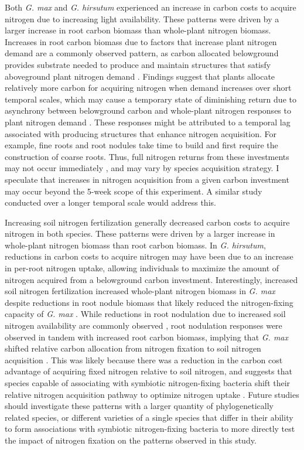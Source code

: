 Both \textit{G. max} and \textit{G. hirsutum} experienced an increase in carbon costs to acquire nitrogen due to increasing light availability. These patterns were driven by a larger increase in root carbon biomass than whole-plant nitrogen biomass. Increases in root carbon biomass due to factors that increase plant nitrogen demand are a commonly observed pattern, as carbon allocated belowground provides substrate needed to produce and maintain structures that satisfy aboveground plant nitrogen demand . Findings suggest that plants allocate relatively more carbon for acquiring nitrogen when demand increases over short temporal scales, which may cause a temporary state of diminishing return due to asynchrony between belowground carbon and whole-plant nitrogen responses to plant nitrogen demand . These responses might be attributed to a temporal lag associated with producing structures that enhance nitrogen acquisition. For example, fine roots  and root nodules  take time to build and first require the construction of coarse roots. Thus, full nitrogen returns from these investments may not occur immediately , and may vary by species acquisition strategy. I speculate that increases in nitrogen acquisition from a given carbon investment may occur beyond the 5-week scope of this experiment. A similar study conducted over a longer temporal scale would address this.

Increasing soil nitrogen fertilization generally decreased carbon costs to acquire nitrogen in both species. These patterns were driven by a larger increase in whole-plant nitrogen biomass than root carbon biomass. In \textit{G. hirsutum}, reductions in carbon costs to acquire nitrogen may have been due to an increase in per-root nitrogen uptake, allowing individuals to maximize the amount of nitrogen acquired from a belowground carbon investment. Interestingly, increased soil nitrogen fertilization increased whole-plant nitrogen biomass in \textit{G. max} despite reductions in root nodule biomass that likely reduced the nitrogen-fixing capacity of \textit{G. max} . While reductions in root nodulation due to increased soil nitrogen availability are commonly observed , root nodulation responses were observed in tandem with increased root carbon biomass, implying that \textit{G. max} shifted relative carbon allocation from nitrogen fixation to soil nitrogen acquisition . This was likely because there was a reduction in the carbon cost advantage of acquiring fixed nitrogen relative to soil nitrogen, and suggests that species capable of associating with symbiotic nitrogen-fixing bacteria shift their relative nitrogen acquisition pathway to optimize nitrogen uptake . Future studies should investigate these patterns with a larger quantity of phylogenetically related species, or different varieties of a single species that differ in their ability to form associations with symbiotic nitrogen-fixing bacteria to more directly test the impact of nitrogen fixation on the patterns observed in this study.

